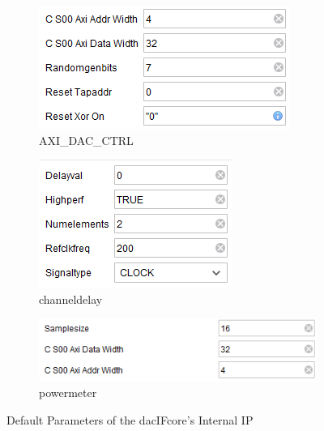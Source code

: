 \documentclass[11pt]{article}
\begin{document}
\begin{figure}[H]
\begin{subfigure}[t]{0.4\linewidth}
		\includegraphics[width=\linewidth]{images/default_dac_param_dac_ctrl}
		\caption{AXI\_DAC\_CTRL}
	\end{subfigure}
	\begin{subfigure}[t]{0.4\linewidth}
		\includegraphics[width=\linewidth]{images/default_dac_param_channel_delay}
		\caption{channel\textunderscore delay}
	\end{subfigure}
	\begin{subfigure}[t]{0.4\linewidth}
		\includegraphics[width=\linewidth]{images/default_dac_param_power_meter}
		\caption{power\textunderscore meter}
	\end{subfigure}
	\caption{Default Parameters of the dac\textunderscore IF\textunderscore core's Internal IP} 
	\label{fig:dacIFparams}
\end{figure}
\end{document}

